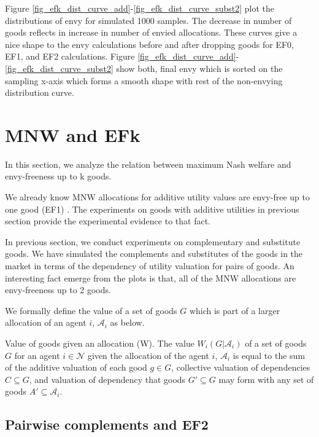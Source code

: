 Figure \ref{fig_efk_dist_curve_add}-\ref{fig_efk_dist_curve_subst2} plot the distributions of envy for simulated 1000 samples. The decrease in number of goods reflects in increase in number of envied allocations. These curves give a nice shape to the envy calculations before and after dropping goods for EF0, EF1, and EF2 calculations. Figure \ref{fig_efk_dist_curve_add}-\ref{fig_efk_dist_curve_subst2} show both, final envy which is sorted on the sampling x-axis which forms a smooth shape with rest of the non-envying distribution curve.


\section{MNW and EFk}
\label{section_proof}

In this section, we analyze the relation between maximum Nash welfare and envy-freeness up to k goods.

We already know MNW allocations for additive utility values are envy-free up to one good (EF1) \cite{caragiannis2016unreasonable}. The experiments on goods with additive utilities in previous section provide the experimental evidence to that fact.

In previous section, we conduct experiments on complementary and substitute goods. We have simulated the complements and substitutes of the goods in the market in terms of the dependency of utility valuation for pairs of goods. An interesting fact emerge from the plots is that, all of the MNW allocations are envy-freeness up to 2 goods.

We formally define the value of a set of goods $G$ which is part of a larger allocation of an agent $i$, $\mathcal{A}_i$ as below.

\begin{definition}{Value of goods given an allocation (W).}
\label{def_dep_value}
The value $W_i(G | \mathcal{A}_i)$ of a set of goods $G$ for an agent $i \in \mathcal{N}$ given the allocation of the agent $i$, $\mathcal{A}_i$ is equal to the sum of the additive valuation of each good $g \in G$, collective valuation of dependencies $C \subseteq G$, and valuation of dependency that goods $G' \subseteq G$ may form with any set of goods $A' \subseteq \mathcal{A}_i$.
\end{definition}

\subsection{Pairwise complements and EF2}
\label{subsection_EF2_compl}


